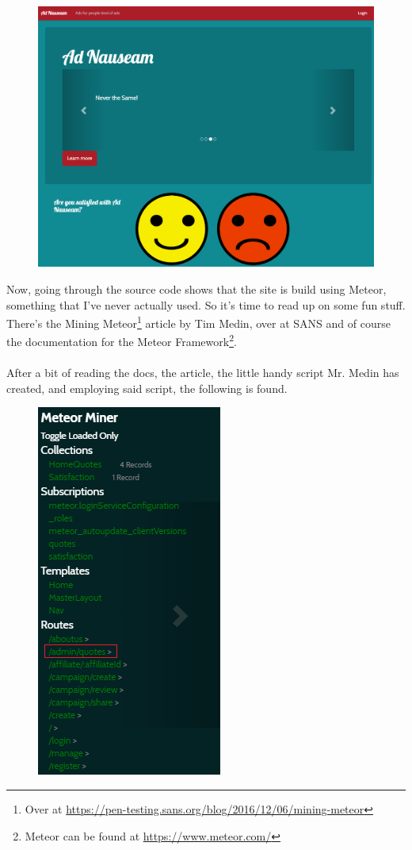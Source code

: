 \documentclass[writeup.tex]{subfiles}
\begin{document}
			\begin{figure}[H]
				\centering
				\includegraphics[scale=0.5]{"screenshots/pwns/Site 4 - frontpage"}
			\end{figure}
			
			Now, going through the source code shows that the site is build using Meteor, something that I've never actually used. So it's time to read up on some fun stuff. There's the Mining Meteor\footnote{Over at \url{https://pen-testing.sans.org/blog/2016/12/06/mining-meteor}} article by Tim Medin, over at SANS and of course the documentation for the Meteor Framework\footnote{Meteor can be found at \url{https://www.meteor.com/}}.\\
			\\
			After a bit of reading the docs, the article, the little handy script Mr. Medin has created, and employing said script, the following is found.
			
			\begin{figure}[H]
				\centering
				\includegraphics[scale=1]{"screenshots/pwns/Site 4 - meteor miner1"}
			\end{figure}
			
\end{document}
